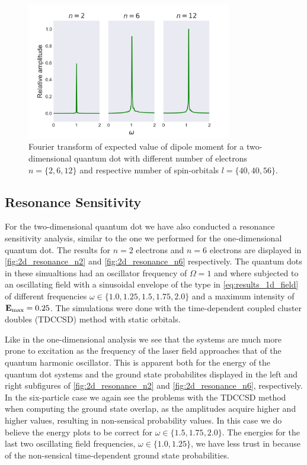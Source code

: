 \begin{figure}
    \centering
    \includegraphics[width=0.8\textwidth]{results/figures/2D/2d_spectrum.png} 
    \caption{Fourier transform of expected value of dipole moment for a
        two-dimensional quantum dot with different number of electrons 
        $n=\{2,6,12\}$ and respective number of spin-orbitals 
        $l=\{40,40,56\}$.
    }
    \label{fig:2d_dipole_spectra}
\end{figure}

\subsection{Resonance Sensitivity}

For the two-dimensional quantum dot we have also conducted a resonance sensitivity analysis,
similar to the one we performed for the one-dimensional quantum dot. The results for 
$n=2$ electrons and $n=6$ electrons are displayed in \autoref{fig:2d_resonance_n2}
and \autoref{fig:2d_resonance_n6} respectively. The quantum dots in these simualtions 
had an oscillator frequency of $\Omega=1$ and where subjected to an oscillating 
field with a sinusoidal envelope of the type in \autoref{eq:results_1d_field} of 
different frequencies $\omega\in\{1.0,1.25,1.5,1.75,2.0\}$ and a maximum intensity of 
$\vb{E}_\text{max}=0.25$. The simulations were done with the time-dependent coupled 
cluster doubles (TDCCSD) method with static orbitals.

Like in the one-dimensional analysis we see that the systems are much more prone to 
excitation as the frequency of the laser field approaches that of the quantum harmonic 
oscillator. This is apparent both for the energy of the quantum dot systems and the 
ground state probabilites displayed in the left and right subfigures of
\autoref{fig:2d_resonance_n2} and \autoref{fig:2d_resonance_n6}, respectively. In the 
six-particle case we again see the problems with the TDCCSD method when computing the 
ground state overlap, as the amplitudes acquire higher and higher values, resulting 
in non-sensical probability values. In this case we do believe the 
energy plots to be correct for $\omega\in\{1.5, 1.75,2.0\}$. The energies for the last 
two oscillating field frequencies, $\omega\in\{1.0,1.25\}$, we have less trust in because 
of the non-sensical time-dependent ground state probabilities.

